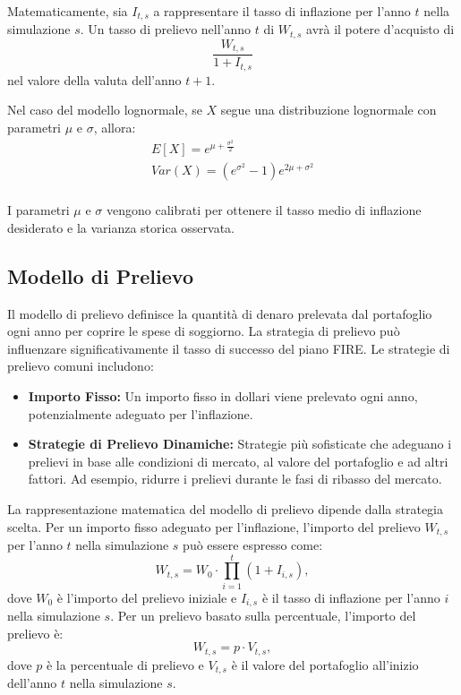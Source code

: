 Matematicamente, sia \(I_{t,s}\) a rappresentare il tasso di inflazione per
l'anno \(t\) nella simulazione \(s\).
Un tasso di prelievo nell'anno \(t\) di
\(W_{t,s}\) avrà il potere d'acquisto di
\[
\frac{W_{t,s}}{1+I_{t,s}}
\]
nel valore della valuta dell'anno \(t+1\).

Nel caso del modello lognormale, se \(X\) segue una distribuzione lognormale con
parametri \(\mu\) e \(\sigma\), allora:
\begin{gather*}
    E[X] = e^{\mu + \frac{\sigma^2}{2}}\\
    Var(X) = (e^{\sigma^2} - 1)e^{2\mu + \sigma^2}\\
\end{gather*}

I parametri \(\mu\) e \(\sigma\) vengono calibrati per ottenere il tasso medio
di inflazione desiderato e la varianza storica osservata.

    \subsection{Modello di Prelievo}\label{subsec:modello-di-prelievo}

Il modello di prelievo definisce la quantità di denaro prelevata dal portafoglio
ogni anno per coprire le spese di soggiorno.
La strategia di prelievo può
influenzare significativamente il tasso di successo del piano FIRE. Le strategie
di prelievo comuni includono:
    \begin{itemize}
        \item \textbf{Importo Fisso:} Un importo fisso in dollari viene
        prelevato ogni anno, potenzialmente adeguato per l'inflazione.
        \item \textbf{Strategie di Prelievo Dinamiche:} Strategie più
        sofisticate che adeguano i prelievi in base alle condizioni di mercato,
        al valore del portafoglio e ad altri fattori.
        Ad esempio, ridurre i
        prelievi durante le fasi di ribasso del mercato.
    \end{itemize}

    La rappresentazione matematica del modello di prelievo dipende dalla
    strategia scelta.
    Per un importo fisso adeguato per l'inflazione, l'importo
    del prelievo \(W_{t,s}\) per l'anno \(t\) nella simulazione \(s\) può essere
    espresso come:
    \[
    W_{t,s} = W_0 \cdot \prod_{i=1}^{t} (1 + I_{i,s}),
    \]
    dove \(W_0\) è l'importo del prelievo iniziale e \(I_{i,s}\) è il tasso di
    inflazione per l'anno \(i\) nella simulazione \(s\).
    Per un prelievo basato
    sulla percentuale, l'importo del prelievo è:
    \[
    W_{t,s} = p \cdot V_{t,s},
    \]
    dove \(p\) è la percentuale di prelievo e \(V_{t,s}\) è il valore del
    portafoglio all'inizio dell'anno \(t\) nella simulazione \(s\).

